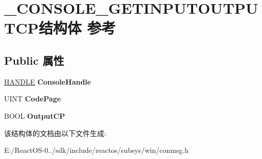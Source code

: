 \hypertarget{struct___c_o_n_s_o_l_e___g_e_t_i_n_p_u_t_o_u_t_p_u_t_c_p}{}\section{\+\_\+\+C\+O\+N\+S\+O\+L\+E\+\_\+\+G\+E\+T\+I\+N\+P\+U\+T\+O\+U\+T\+P\+U\+T\+C\+P结构体 参考}
\label{struct___c_o_n_s_o_l_e___g_e_t_i_n_p_u_t_o_u_t_p_u_t_c_p}
\subsection*{Public 属性}
\begin{DoxyCompactItemize}
\item 
\mbox{\label{struct___c_o_n_s_o_l_e___g_e_t_i_n_p_u_t_o_u_t_p_u_t_c_p_ae7e72df6e6f4a21273bbb1e8da10812d}} 
\hyperlink{interfacevoid}{H\+A\+N\+D\+LE} {\bfseries Console\+Handle}
\item 
\mbox{\label{struct___c_o_n_s_o_l_e___g_e_t_i_n_p_u_t_o_u_t_p_u_t_c_p_a9e231c726df0dabc28f70e67bdbf8a73}} 
U\+I\+NT {\bfseries Code\+Page}
\item 
\mbox{\label{struct___c_o_n_s_o_l_e___g_e_t_i_n_p_u_t_o_u_t_p_u_t_c_p_a42789d97fb382945f7a4c745d28a56ef}} 
B\+O\+OL {\bfseries Output\+CP}
\end{DoxyCompactItemize}


该结构体的文档由以下文件生成\+:\begin{DoxyCompactItemize}
\item 
E\+:/\+React\+O\+S-\/0../sdk/include/reactos/subsys/win/conmsg.\+h\end{DoxyCompactItemize}
